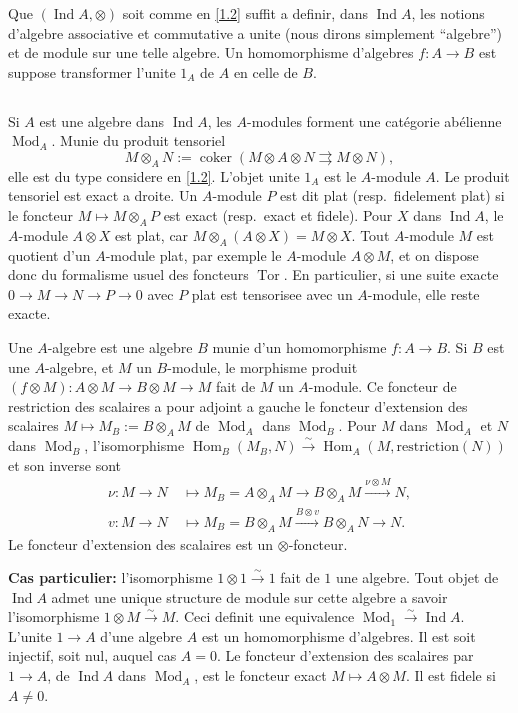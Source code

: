 \documentclass[11pt,a4paper]{article}
\theoremstyle{plain}
\theoremstyle{definition}
\DeclareMathOperator{\Hom}{Hom}
\DeclareMathOperator{\coker}{coker}
\DeclareMathOperator{\Ind}{Ind}
\DeclareMathOperator{\Tor}{Tor}
\newcommand{\simto}{\xrightarrow{\sim}}
\newcommand{\Mod}{\operatorname{Mod}}
\begin{document}
Que $(\Ind A,\otimes)$ soit comme en \ref{1.2} suffit a definir, dans $\Ind A$, les notions d'algebre associative et commutative a unite (nous dirons simplement ``algebre'') et de module sur une telle algebre. Un homomorphisme d'algebres $f:A\to B$ est suppose transformer l'unite $1_A$ de $A$ en celle de $B$.

\subsection{}\label{2.3}

Si $A$ est une algebre dans $\Ind A$, les $A$-modules forment une cat\'egorie ab\'elienne $\Mod_A$. Munie du produit tensoriel
\[
M\otimes_A N:=\coker(M\otimes A\otimes N\rightrightarrows M\otimes N),
\]
elle est du type considere en \ref{1.2}. L'objet unite $1_A$ est le $A$-module $A$. Le produit tensoriel est exact a droite. Un $A$-module $P$ est dit plat (resp.~fidelement plat) si le foncteur $M\mapsto M\otimes_A P$ est exact (resp.~exact et fidele). Pour $X$ dans $\Ind A$, le $A$-module $A\otimes X$ est plat, car $M\otimes_A(A\otimes X)=M\otimes X$. Tout $A$-module $M$ est quotient d'un $A$-module plat, par exemple le $A$-module $A\otimes M$, et on dispose donc du formalisme usuel des foncteurs $\Tor$. En particulier, si une suite exacte $0\to M\to N\to P\to 0$ avec $P$ plat est tensorisee avec un $A$-module, elle reste exacte.

Une $A$-algebre est une algebre $B$ munie d'un homomorphisme $f:A\to B$. Si $B$ est une $A$-algebre, et $M$ un $B$-module, le morphisme produit $(f\otimes M):A\otimes M\to B\otimes M\to M$ fait de $M$ un $A$-module. Ce foncteur de restriction des scalaires a pour adjoint a gauche le foncteur d'extension des scalaires $M\mapsto M_B:=B\otimes_A M$ de $\Mod_A$ dans $\Mod_B$. Pour $M$ dans $\Mod_A$ et $N$ dans $\Mod_B$, l'isomorphisme $\Hom_B(M_B,N)\simto\Hom_A(M,\text{restriction}(N))$ et son inverse sont
\begin{align*}
\nu:M\to N\ &\mapsto M_B=A\otimes_A M\to B\otimes_A M\xrightarrow{\nu\otimes M}N,\\
v:M\to N\ &\mapsto M_B=B\otimes_A M\xrightarrow{B\otimes v} B\otimes_A N\to N.
\end{align*}
Le foncteur d'extension des scalaires est un $\otimes$-foncteur.

\medskip\noindent\textbf{Cas particulier:} l'isomorphisme $1\otimes1\xrightarrow{\sim}1$ fait de $1$ une algebre. Tout objet de $\Ind A$ admet une unique structure de module sur cette algebre a savoir l'isomorphisme $1\otimes M\xrightarrow{\sim}M$. Ceci definit une equivalence $\Mod_1\xrightarrow{\sim}\Ind A$. L'unite $1\to A$ d'une algebre $A$ est un homomorphisme d'algebres. Il est soit injectif, soit nul, auquel cas $A=0$. Le foncteur d'extension des scalaires par $1\to A$, de $\Ind A$ dans $\Mod_A$, est le foncteur exact $M\mapsto A\otimes M$. Il est fidele si $A\neq0$.
\end{document}
